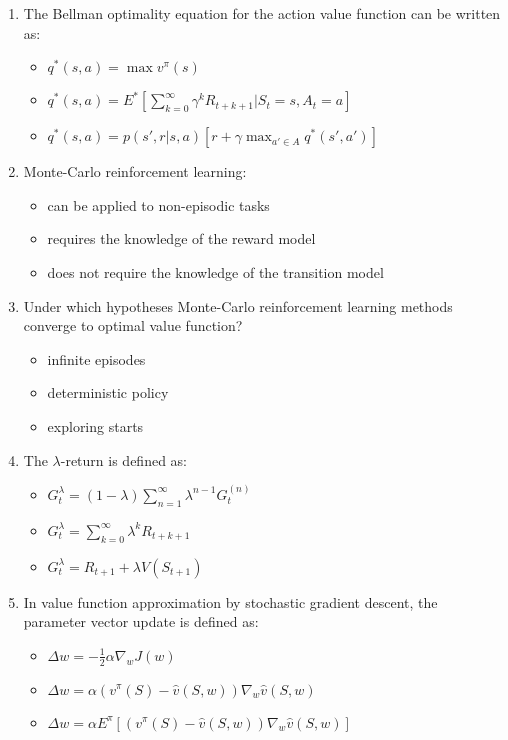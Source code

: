 \documentclass[openany]{book}
\theoremstyle{definition}
\theoremstyle{remark}
\begin{document}
\begin{enumerate}
    \item The Bellman optimality equation for the action value function can be written as:
    \begin{itemize}
        \item[] $q^*(s,a) = \max v^\pi(s)$
        \item[\checkmark] $q^*(s,a) = E^*[\sum_{k=0}^\infty \gamma^k R_{t+k+1}|S_t = s, A_t = a]$
        \item[] $q^*(s,a) = p(s', r|s,a)[r + \gamma \max_{a'\in A} q^*(s',a')]$
    \end{itemize}

    \item Monte-Carlo reinforcement learning:
    \begin{itemize}
        \item[] can be applied to non-episodic tasks
        \item[] requires the knowledge of the reward model
        \item[\checkmark] does not require the knowledge of the transition model
    \end{itemize}

    \item Under which hypotheses Monte-Carlo reinforcement learning methods converge to optimal value function?
    \begin{itemize}
        \item[\checkmark] infinite episodes
        \item[] deterministic policy
        \item[\checkmark] exploring starts
    \end{itemize}

    \item The $\lambda$-return is defined as:
    \begin{itemize}
        \item[\checkmark] $G^\lambda_t = (1-\lambda)\sum_{n=1}^\infty \lambda^{n-1}G^{(n)}_t$
        \item[] $G^\lambda_t = \sum_{k=0}^\infty \lambda^k R_{t+k+1}$
        \item[] $G^\lambda_t = R_{t+1} + \lambda V(S_{t+1})$
    \end{itemize}

    \item In value function approximation by stochastic gradient descent, the parameter vector update is defined as:
    \begin{itemize}
        \item[] $\Delta w = -\frac{1}{2}\alpha\nabla_w J(w)$
        \item[\checkmark] $\Delta w = \alpha(v^\pi(S) - \hat{v}(S,w))\nabla_w \hat{v}(S,w)$
        \item[] $\Delta w = \alpha E^\pi[(v^\pi(S) - \hat{v}(S,w))\nabla_w \hat{v}(S,w)]$
    \end{itemize}
\end{enumerate}
\end{document}
